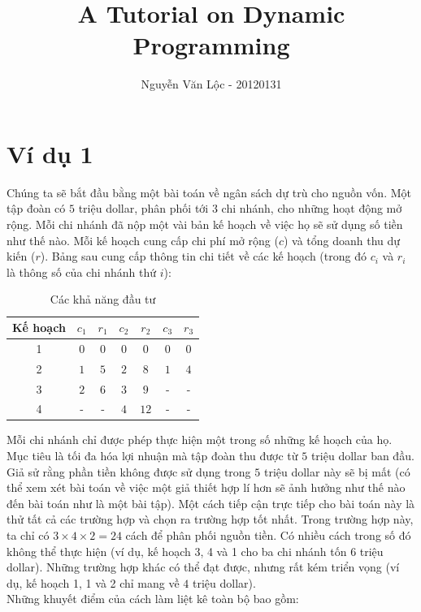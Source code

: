 \documentclass[12pt,a4paper]{article}
\author{Nguyễn Văn Lộc - 20120131}
\title{\textbf{A Tutorial on Dynamic Programming}}
\begin{document}
\maketitle
\section{Ví dụ 1}
Chúng ta sẽ bắt đầu bằng một bài toán về ngân sách dự trù cho nguồn vốn. Một tập đoàn có \(5\) triệu dollar, phân phối tới \(3\) chi nhánh, cho những hoạt động mở rộng. Mỗi chi nhánh đã nộp một vài bản kế hoạch về việc họ sẽ sử dụng số tiền như thế nào. Mỗi kế hoạch cung cấp chi phí mở rộng (\(c\)) và tổng doanh thu dự kiến (\(r\)). Bảng sau cung cấp thông tin chi tiết về các kế hoạch (trong đó \(c_i\) và \(r_i\) là thông số của chi nhánh thứ \(i\)):\\
\begin{table}[h]
\begin{center}
\begin{tabular}{|c|c|c|c|c|c|c|}
\hline 
Kế hoạch & \(c_1\) & \(r_1\) & \(c_2\) & \(r_2\) & \(c_3\) & \(r_3\) \\ 
\hline 
1 & \(0\) & \(0\) & \(0\) & \(0\) & \(0\) & \(0\) \\ 
\hline 
2 & \(1\) & \(5\) & \(2\) & \(8\) & \(1\) & \(4\) \\ 
\hline 
3 & \(2\) & \(6\)  & \(3\) & \(9\) & - & - \\ 
\hline 
4 & - & - & \(4\) & \(12\) & - & - \\ 
\hline 
\end{tabular} 
\caption{Các khả năng đầu tư}
\end{center}
\end{table}
Mỗi chi nhánh chỉ được phép thực hiện một trong số những kế hoạch của họ. Mục tiêu là tối đa hóa lợi nhuận mà tập đoàn thu được từ \(5\) triệu dollar ban đầu. Giả sử rằng phần tiền không được sử dụng trong \(5\) triệu dollar này sẽ bị mất (có thể xem xét bài toán về việc một giả thiết hợp lí hơn sẽ ảnh hưởng như thế nào đến bài toán như là một bài tập).
Một cách tiếp cận trực tiếp cho bài toán này là thử tất cả các trường hợp và chọn ra trường hợp tốt nhất. Trong trường hợp này, ta chỉ có \(3 \times 4 \times 2 = 24\) cách để phân phối nguồn tiền. Có nhiều cách trong số đó không thể thực hiện (ví dụ, kế hoạch 3, 4 và 1 cho ba chi nhánh tốn \(6\) triệu dollar). Những trường hợp khác có thể đạt được, nhưng rất kém triển vọng (ví dụ, kế hoạch 1, 1 và 2 chỉ mang về \(4\) triệu dollar).\\
Những khuyết điểm của cách làm liệt kê toàn bộ bao gồm:
\end{document}
